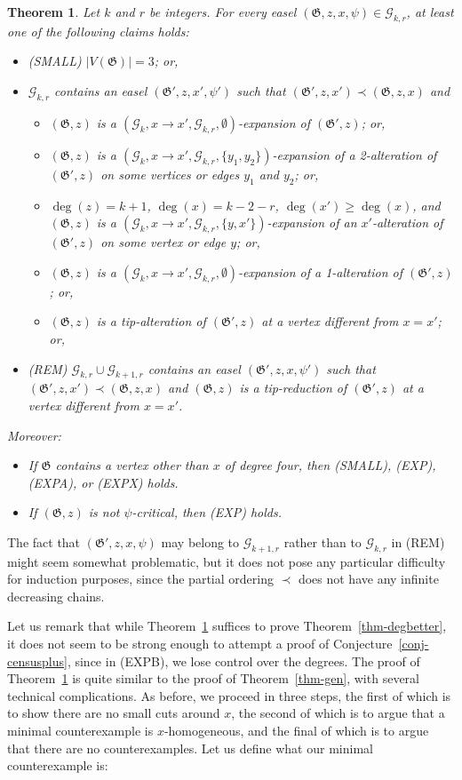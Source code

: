 \documentclass{article}
\newcommand{\GG}{\mathcal{G}}
\newcommand\g{\mathfrak{G}}
\newtheorem{theorem}{Theorem}[section]
\begin{document}
\begin{theorem}\label{thm-genladeg}
Let $k$ and $r$ be integers.  For every easel $(\g,z,x,\psi)\in\GG_{k,r}$, at least one of the following claims holds: 
\begin{itemize}%
\item (SMALL) $|V(\g)|=3$; or,

\item $\GG_{k,r}$ contains an easel $(\g',z,x',\psi')$ such that $(\g',z,x')\prec (\g,z,x)$ and 
\begin{itemize}[align=left, leftmargin=3mm, labelwidth=1.5cm,itemindent=1.5cm,]
\item[(EXP)] $(\g,z)$ is a $(\GG_k,x\to x',\GG_{k,r},\emptyset)$-expansion of $(\g',z)$; or,
\item[(EXPA)] $(\g,z)$ is a $(\GG_k,x\to x',\GG_{k,r},\{y_1,y_2\})$-expansion of a 2-alteration of $(\g',z)$ on some vertices or edges $y_1$ and $y_2$; or,
\item[(EXPX)] $\deg(z)=k+1$, $\deg(x)=k-2-r$, $\deg(x') \ge\deg(x)$, and $(\g,z)$ is a $(\GG_k,x\to x',\GG_{k,r},\{y,x'\})$-expansion of an $x'$-alteration of $(\g',z)$ on some vertex or edge $y$; or,
\item[(EXPB)] $(\g,z)$ is a $(\GG_k,x\to x',\GG_{k,r},\emptyset)$-expansion of a 1-alteration of $(\g',z)$; or,
\item[(ADD)] $(\g,z)$ is a tip-alteration of $(\g',z)$ at a vertex different from $x=x'$; or,
\end{itemize}
\item (REM) $\GG_{k,r}\cup \GG_{k+1,r}$ contains an easel $(\g',z,x,\psi')$ such that $(\g',z,x')\prec (\g,z,x)$ and $(\g,z)$ is a tip-reduction of $(\g',z)$ at a vertex different from $x=x'$.
\end{itemize}
Moreover:
\begin{itemize}
\item If $\g$ contains a vertex other than $x$ of degree four, then (SMALL), (EXP), (EXPA), or (EXPX) holds.
\item If $(\g,z)$ is not $\psi$-critical, then (EXP) holds.
\end{itemize}
\end{theorem}
The fact that $(\g',z,x,\psi)$ may belong to $\GG_{k+1,r}$ rather than to $\GG_{k,r}$ in (REM) might seem somewhat problematic, but it does not pose any particular difficulty
for induction purposes, since the partial ordering $\prec$ does not have any infinite decreasing chains.

Let us remark that while Theorem~\ref{thm-genladeg} suffices to prove Theorem~\ref{thm-degbetter}, it does not seem to be strong enough
to attempt a proof of Conjecture~\ref{conj-censusplus}, since in (EXPB), we lose control over the degrees.
The proof of Theorem~\ref{thm-genladeg} is quite similar to the proof of Theorem~\ref{thm-gen}, with several technical complications. As before, we proceed in three steps, the first of which is to show there are no small cuts around $x$, the second of which is to argue that a minimal counterexample is $x$-homogeneous, and the final of which is to argue that there are no counterexamples. Let us define what our minimal counterexample is:
\end{document}
